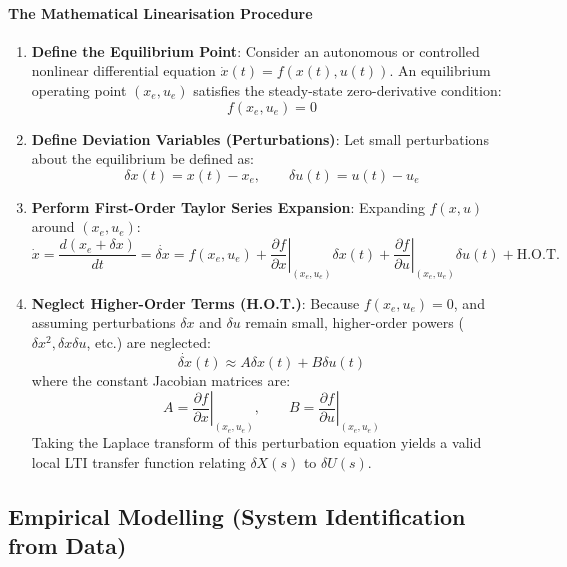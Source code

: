 \documentclass[12pt,onecolumn,twoside ]{article}
\begin{document}
	\paragraph{The Mathematical Linearisation Procedure}
	\begin{enumerate}
		\item
		\textbf{Define the Equilibrium Point}: Consider an autonomous or controlled nonlinear differential equation $\dot{x}(t) = f(x(t), u(t))$. An equilibrium operating point $(x_e, u_e)$ satisfies the steady-state zero-derivative condition: \[
		f(x_e, u_e) = 0
		\]
		\item
		\textbf{Define Deviation Variables (Perturbations)}: Let small perturbations about the equilibrium be defined as: \[
		\delta x(t) = x(t) - x_e, \qquad \delta u(t) = u(t) - u_e
		\]
		\item
		\textbf{Perform First-Order Taylor Series Expansion}: Expanding $f(x, u)$ around $(x_e, u_e)$: \[
		\dot{x} = \frac{d(x_e + \delta x)}{dt} = \dot{\delta x} = f(x_e, u_e) + \left. \frac{\partial f}{\partial x} \right|_{(x_e, u_e)} \delta x(t) + \left. \frac{\partial f}{\partial u} \right|_{(x_e, u_e)} \delta u(t) + \text{H.O.T.}
		\]
		\item
		\textbf{Neglect Higher-Order Terms (H.O.T.)}: Because $f(x_e, u_e) = 0$, and assuming perturbations $\delta x$ and $\delta u$ remain small, higher-order powers ($\delta x^2, \delta x \delta u$, etc.) are neglected: \[
		\dot{\delta x}(t) \approx A \delta x(t) + B \delta u(t)
		\] where the constant Jacobian matrices are: \[
		A = \left. \frac{\partial f}{\partial x} \right|_{(x_e, u_e)}, \qquad B = \left. \frac{\partial f}{\partial u} \right|_{(x_e, u_e)}
		\] Taking the Laplace transform of this perturbation equation yields a valid local LTI transfer function relating $\delta X(s)$ to $\delta U(s)$.
	\end{enumerate}
	
	\subsection{Empirical Modelling (System Identification from Data)}
\end{document}
